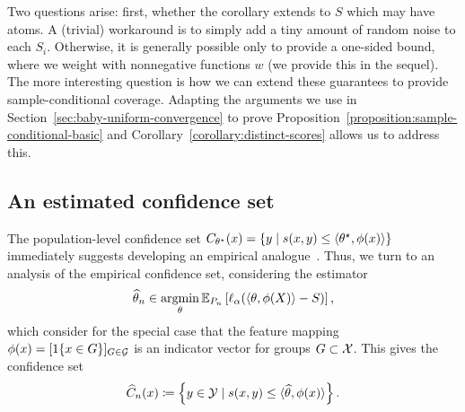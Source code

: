 \documentclass[11pt]{article}
\newcommand{\loss}{\ell}
\newcommand{\scorefunc}{s}
\newcommand{\scoreval}{\scorefunc}
\newcommand{\scorerv}{S}
\begin{document}
Two questions arise: first, whether the corollary
extends to $\scorerv$ which may have atoms.
%
A (trivial) workaround is to simply add a tiny amount of random noise to
each $\scorerv_i$.
%
Otherwise, it is generally possible only to provide a one-sided bound, where
we weight with nonnegative functions $w$ (we provide this in the sequel).
%
The more interesting question is how we can extend
these guarantees to provide sample-conditional coverage.
%
Adapting the arguments we use in Section~\ref{sec:baby-uniform-convergence}
to prove Proposition~\ref{proposition:sample-conditional-basic} and
Corollary~\ref{corollary:distinct-scores}
allows us to address this.




\subsection{An estimated confidence set}

The population-level confidence set $C_{\theta\opt}(x) = \{y \mid
\scoreval(x, y) \le \<\theta\opt, \phi(x)\>\}$ immediately suggests
developing an empirical analogue~\cite{GibbsChCa23, JungNoRaRo23}.
%
Thus, we turn to an analysis of the empirical confidence set,
considering the estimator
\begin{equation}
  \what{\theta}_n \in
  \argmin_\theta
  \E_{P_n}\left[\loss_\alpha(\<\theta, \phi(X)\> - \scorerv)\right],
  \label{eqn:empirical-quantile-estimator}
\end{equation}
which \citet{JungNoRaRo23} consider for the special
case that the feature mapping $\phi(x) = [1\!\left\{x \in G\right\}]_{G \in \mathcal{G}}$ is an
indicator vector for groups $G \subset \mathcal{X}$.
%
This gives
the confidence set
\begin{equation*}
  \what{C}_n(x) \defeq \left\{y \in \mc{Y}
  \mid \scoreval(x, y) \le \<\what{\theta}, \phi(x)\> \right\}.
\end{equation*}
\end{document}
